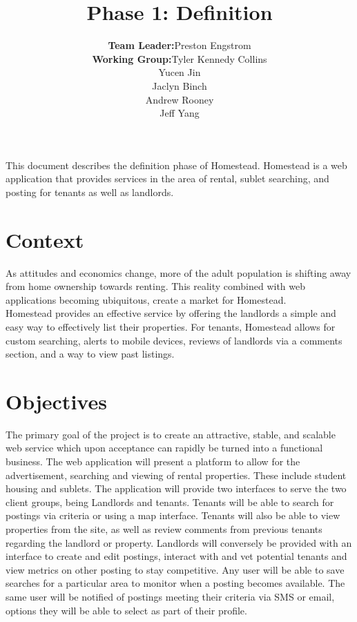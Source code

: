 \documentclass[]{article}
\title{Phase 1: Definition}
\author{ \begin{tabular}{rl}
		\textbf{Team Leader:} & Preston Engstrom \\
		\textbf{Working Group:} & Tyler Kennedy Collins\\ & Yucen Jin \\ & Jaclyn Binch  \\ & Andrew Rooney \\ & Jeff Yang
	\end{tabular}}
\date{}
\begin{document}
\maketitle

\thispagestyle{fancy}

\abstract
This document describes the definition phase of Homestead. Homestead is a web application that provides services in the area of rental, sublet searching, and posting for tenants as well as landlords.

\section{Context}
As attitudes and economics change, more of the adult population is shifting away from home ownership towards renting. This reality combined with web applications becoming ubiquitous, create a market for Homestead. \\Homestead provides an effective service by offering the landlords a simple and easy way to effectively list their properties. For tenants, Homestead allows for custom searching, alerts to mobile devices, reviews of landlords via a comments section, and a way to view past listings.

\section{Objectives}
The primary goal of the project is to create an attractive, stable, and scalable web service which upon acceptance can rapidly be turned into a functional business. The web application will present a platform to allow for the advertisement, searching and viewing of rental properties. These include student housing and sublets. The application will provide two interfaces to serve the two client groups, being Landlords and tenants. Tenants will be able to search for postings via criteria or using a map interface. Tenants will also be able to view properties from the site, as well as review comments from previous tenants regarding the landlord or property. Landlords will conversely be provided with an interface to create and edit postings, interact with and vet potential tenants and view metrics on other posting to stay competitive. Any user will be able to save searches for a particular area to monitor when a posting becomes available. The same user will be notified of postings meeting their criteria via SMS or email, options they will be able to select as part of their profile.
\end{document}
